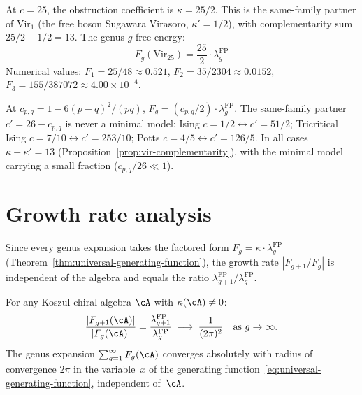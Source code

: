 \begin{computation}[Virasoro at \texorpdfstring{$c = 25$}{c = 25}]
\label{comp:vir-c25-genera}
At $c = 25$, the obstruction coefficient is
$\kappa = 25/2$.  This is the same-family partner of
$\mathrm{Vir}_1$ (the free boson Sugawara Virasoro,
$\kappa' = 1/2$), with complementarity sum
$25/2 + 1/2 = 13$.  The genus-$g$ free energy:
\[
F_g(\mathrm{Vir}_{25}) = \frac{25}{2}
\cdot \lambda_g^{\mathrm{FP}}
\]
Numerical values:
$F_1 = 25/48 \approx 0.521$,
$F_2 = 35/2304 \approx 0.0152$,
$F_3 = 155/387072 \approx 4.00 \times 10^{-4}$.
\end{computation}

\begin{remark}
\label{rem:minimal-model-genera}
At $c_{p,q} = 1 - 6(p-q)^2/(pq)$, $F_g = (c_{p,q}/2) \cdot \lambda_g^{\mathrm{FP}}$.  The same-family partner $c' = 26 - c_{p,q}$ is never a minimal model: Ising $c=1/2 \leftrightarrow c'=51/2$; Tricritical Ising $c=7/10 \leftrightarrow c'=253/10$; Potts $c=4/5 \leftrightarrow c'=126/5$.  In all cases $\kappa + \kappa' = 13$ (Proposition~\ref{prop:vir-complementarity}), with the minimal model carrying a small fraction ($c_{p,q}/26 \ll 1$).
\end{remark}


\section{Growth rate analysis}\label{sec:growth-rate-genera}

Since every genus expansion takes the factored form
$F_g = \kappa \cdot \lambda_g^{\mathrm{FP}}$
(Theorem~\ref{thm:universal-generating-function}), the
growth rate $|F_{g+1}/F_g|$ is independent of the algebra
and equals the ratio
$\lambda_{g+1}^{\mathrm{FP}}/\lambda_g^{\mathrm{FP}}$.

\begin{proposition}\label{prop:universal-growth-rate}
For any Koszul chiral algebra $\cA$ with $\kappa(\cA) \neq 0$:
\begin{equation}\label{eq:universal-growth-rate}
\frac{|F_{g+1}(\cA)|}{|F_g(\cA)|}
= \frac{\lambda_{g+1}^{\mathrm{FP}}}
{\lambda_g^{\mathrm{FP}}}
\;\longrightarrow\; \frac{1}{(2\pi)^2}
\quad \text{as } g \to \infty.
\end{equation}
The genus expansion $\sum_{g=1}^\infty F_g(\cA)$
converges absolutely with radius of convergence $2\pi$
in the variable~$x$ of the generating function~\eqref{eq:universal-generating-function}, independent
of~$\cA$.
\end{proposition}

